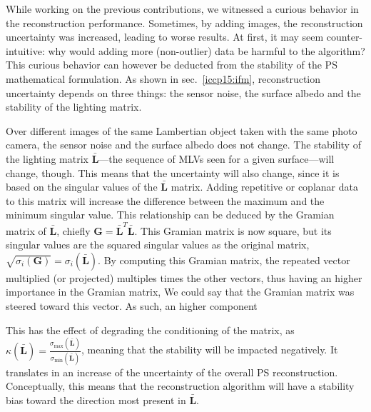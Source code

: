 While working on the previous contributions, we witnessed a curious behavior in the reconstruction performance. Sometimes, by adding images, the reconstruction uncertainty was increased, leading to worse results. At first, it may seem counter-intuitive: why would adding more (non-outlier) data be harmful to the algorithm? This curious behavior can however be deducted from the stability of the PS mathematical formulation. As shown in sec.~\ref{iccp15:ifm}, reconstruction uncertainty depends on three things: the sensor noise, the surface albedo and the stability of the lighting matrix.

Over different images of the same Lambertian object taken with the same photo camera, the sensor noise and the surface albedo does not change. The stability of the lighting matrix $\bar{\mathbf{L}}$---the sequence of MLVs seen for a given surface---will change, though. This means that the uncertainty will also change, since it is based on the singular values of the $\bar{\mathbf{L}}$ matrix. Adding repetitive or coplanar data to this matrix will increase the difference between the maximum and the minimum singular value. This relationship can be deduced by the Gramian matrix of $\bar{\mathbf{L}}$, chiefly $\mathbf{G} = \bar{\mathbf{L}}^T\bar{\mathbf{L}}$. This Gramian matrix is now square, but its singular values are the squared singular values as the original matrix, $\sqrt{\sigma_i(\mathbf{G})} = \sigma_i(\bar{\mathbf{L}})$. By computing this Gramian matrix, the repeated vector multiplied (or projected) multiples times the other vectors, thus having an higher importance in the Gramian matrix, We could say that the Gramian matrix was steered toward this vector. As such, an higher component 

This has the effect of degrading the conditioning of the matrix, as $\kappa(\bar{\mathbf{L}}) = \frac{\sigma_{\max}(\bar{\mathbf{L}}) }{ \sigma_{\min}(\bar{\mathbf{L}}) }$, meaning that the stability will be impacted negatively. It translates in an increase of the uncertainty of the overall PS reconstruction. Conceptually, this means that the reconstruction algorithm will have a stability bias toward the direction most present in $\bar{\mathbf{L}}$.

